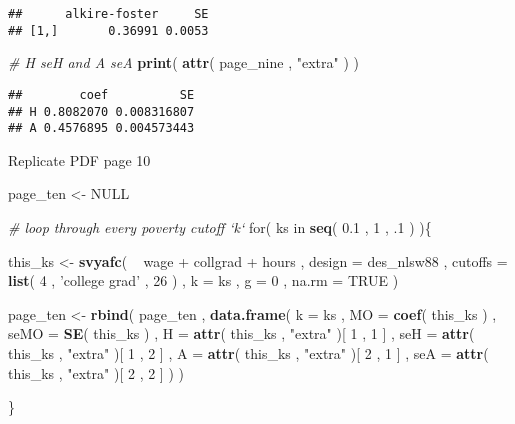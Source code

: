 \documentclass[]{book}
\newenvironment{Shaded}{\begin{snugshade}}{\end{snugshade}}
\newcommand{\KeywordTok}[1]{\textcolor[rgb]{0.13,0.29,0.53}{\textbf{{#1}}}}
\newcommand{\DataTypeTok}[1]{\textcolor[rgb]{0.13,0.29,0.53}{{#1}}}
\newcommand{\DecValTok}[1]{\textcolor[rgb]{0.00,0.00,0.81}{{#1}}}
\newcommand{\FloatTok}[1]{\textcolor[rgb]{0.00,0.00,0.81}{{#1}}}
\newcommand{\StringTok}[1]{\textcolor[rgb]{0.31,0.60,0.02}{{#1}}}
\newcommand{\CommentTok}[1]{\textcolor[rgb]{0.56,0.35,0.01}{\textit{{#1}}}}
\newcommand{\OtherTok}[1]{\textcolor[rgb]{0.56,0.35,0.01}{{#1}}}
\newcommand{\NormalTok}[1]{{#1}}
\begin{document}
\begin{verbatim}
##      alkire-foster     SE
## [1,]       0.36991 0.0053
\end{verbatim}

\begin{Shaded}
\begin{Highlighting}[]
\CommentTok{# H seH and A seA}
\KeywordTok{print}\NormalTok{( }\KeywordTok{attr}\NormalTok{( page_nine , }\StringTok{"extra"} \NormalTok{) )}
\end{Highlighting}
\end{Shaded}

\begin{verbatim}
##        coef          SE
## H 0.8082070 0.008316807
## A 0.4576895 0.004573443
\end{verbatim}

Replicate PDF page 10

\begin{Shaded}
\begin{Highlighting}[]
\NormalTok{page_ten <-}\StringTok{ }\OtherTok{NULL}

\CommentTok{# loop through every poverty cutoff `k`}
\NormalTok{for( ks in }\KeywordTok{seq}\NormalTok{( }\FloatTok{0.1} \NormalTok{, }\DecValTok{1} \NormalTok{, .}\DecValTok{1} \NormalTok{) )\{}
    
    \NormalTok{this_ks <-}
\StringTok{        }\KeywordTok{svyafc}\NormalTok{(}
            \NormalTok{~}\StringTok{ }\NormalTok{wage +}\StringTok{ }\NormalTok{collgrad +}\StringTok{ }\NormalTok{hours , }
            \DataTypeTok{design =} \NormalTok{des_nlsw88 , }
            \DataTypeTok{cutoffs =} \KeywordTok{list}\NormalTok{( }\DecValTok{4} \NormalTok{, }\StringTok{'college grad'} \NormalTok{, }\DecValTok{26} \NormalTok{) , }
            \DataTypeTok{k =} \NormalTok{ks , }
            \DataTypeTok{g =} \DecValTok{0} \NormalTok{, }
            \DataTypeTok{na.rm =} \OtherTok{TRUE} 
           \NormalTok{)}
    
    \NormalTok{page_ten <-}
\StringTok{        }\KeywordTok{rbind}\NormalTok{(}
            \NormalTok{page_ten ,}
            \KeywordTok{data.frame}\NormalTok{( }
                \DataTypeTok{k =} \NormalTok{ks , }
                \DataTypeTok{MO =} \KeywordTok{coef}\NormalTok{( this_ks ) ,}
                \DataTypeTok{seMO =} \KeywordTok{SE}\NormalTok{( this_ks ) ,}
                \DataTypeTok{H =} \KeywordTok{attr}\NormalTok{( this_ks , }\StringTok{"extra"} \NormalTok{)[ }\DecValTok{1} \NormalTok{, }\DecValTok{1} \NormalTok{] ,}
                \DataTypeTok{seH =} \KeywordTok{attr}\NormalTok{( this_ks , }\StringTok{"extra"} \NormalTok{)[ }\DecValTok{1} \NormalTok{, }\DecValTok{2} \NormalTok{] ,}
                \DataTypeTok{A =} \KeywordTok{attr}\NormalTok{( this_ks , }\StringTok{"extra"} \NormalTok{)[ }\DecValTok{2} \NormalTok{, }\DecValTok{1} \NormalTok{] ,}
                \DataTypeTok{seA =} \KeywordTok{attr}\NormalTok{( this_ks , }\StringTok{"extra"} \NormalTok{)[ }\DecValTok{2} \NormalTok{, }\DecValTok{2} \NormalTok{]}
          \NormalTok{)}
        \NormalTok{)}
    
\NormalTok{\}}
\end{Highlighting}
\end{Shaded}
\end{document}
